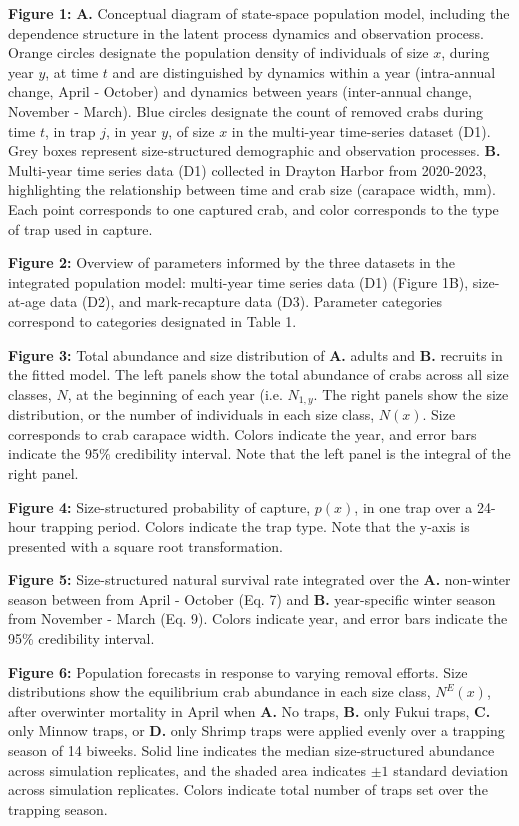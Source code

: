 \documentclass{article}
\begin{document}
\textbf{Figure 1:} \textbf{A.} Conceptual diagram of state-space population model, including the dependence structure in the latent process dynamics and observation process. Orange circles designate the population density of individuals of size $x$, during year $y$, at time $t$ and are distinguished by dynamics within a year (intra-annual change, April - October) and dynamics between years (inter-annual change, November - March). Blue circles designate the count of removed crabs during time $t$, in trap $j$, in year $y$, of size $x$ in the multi-year time-series dataset (D1). Grey boxes represent size-structured demographic and observation processes. \textbf{B.} Multi-year time series data (D1) collected in Drayton Harbor from 2020-2023, highlighting the relationship between time and crab size (carapace width, mm). Each point corresponds to one captured crab, and color corresponds to the type of trap used in capture.

\textbf{Figure 2:} Overview of parameters informed by the three datasets in the integrated population model: multi-year time series data (D1) (Figure 1B), size-at-age data (D2), and mark-recapture data (D3). Parameter categories correspond to categories designated in Table 1.

\textbf{Figure 3:} Total abundance and size distribution of \textbf{A.} adults and \textbf{B.} recruits in the fitted model. The left panels show the total abundance of crabs across all size classes, $N$, at the beginning of each year (i.e. $N_{1, y}$. The right panels show the size distribution, or the number of individuals in each size class, $N(x)$. Size corresponds to crab carapace width. Colors indicate the year, and error bars indicate the 95\% credibility interval. Note that the left panel is the integral of the right panel.

\textbf{Figure 4:} Size-structured probability of capture, $p(x)$, in one trap over a 24-hour trapping period. Colors indicate the trap type. Note that the y-axis is presented with a square root transformation.

\textbf{Figure 5:} Size-structured natural survival rate integrated over the \textbf{A.} non-winter season between from April - October (Eq. 7) and \textbf{B.} year-specific winter season from November - March (Eq. 9). Colors indicate year, and error bars indicate the 95\% credibility interval.

\textbf{Figure 6:} Population forecasts in response to varying removal efforts. Size distributions show the equilibrium crab abundance in each size class, $N^E(x)$, after overwinter mortality in April when \textbf{A.} No traps, \textbf{B.} only Fukui traps, \textbf{C.} only Minnow traps, or \textbf{D.} only Shrimp traps were applied evenly over a trapping season of 14 biweeks. Solid line indicates the median size-structured abundance across simulation replicates, and the shaded area indicates $\pm1$ standard deviation across simulation replicates. Colors indicate total number of traps set over the trapping season.


\printbibliography[]
\end{document}
